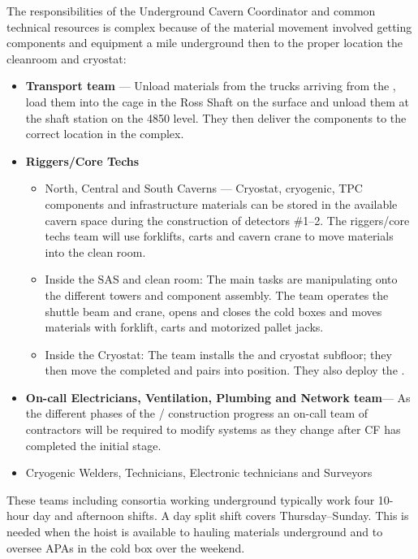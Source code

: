 The responsibilities of the Underground Cavern Coordinator and common
technical resources is complex because of the material movement
involved getting components and equipment a mile underground then to
the proper location the cleanroom and cryostat:
\begin{itemize}
  \item {\bf Transport team} --- Unload materials from the trucks arriving
    from the , load them into the cage in the Ross Shaft on the
    surface and unload them at the shaft station on the 4850 level.
    They then deliver the components to the correct location in the
     complex.
  \item {\bf {} Riggers/Core Techs}
    \begin{itemize}
      \item North, Central and South Caverns --- Cryostat, cryogenic,
        TPC components and infrastructure materials can be stored in
        the available cavern space during the construction of
        detectors \#1--2.  The  riggers/core techs team will use
        forklifts, carts and cavern crane to move materials into the
        clean room.
      \item Inside the SAS and clean room: The main tasks are
        manipulating  onto the different 
        towers and  component assembly. The team operates
        the shuttle beam and crane, opens and closes the cold boxes
        and moves materials with forklift, carts and motorized pallet
        jacks.
      \item Inside the Cryostat: The  team installs the
         and cryostat subfloor; they then move the
        completed  and  pairs into
        position. They also deploy the .
    \end{itemize}
  \item {\bf On-call Electricians, Ventilation, Plumbing and Network
    team}--- As the different phases of the /
    construction progress an on-call team of contractors will be
    required to modify systems as they change after CF has completed
    the initial stage.
   \item  Cryogenic Welders, Technicians, Electronic technicians and Surveyors
\end{itemize}

These teams including consortia working underground typically work
four 10-hour day and afternoon shifts.  A day split shift covers
Thursday--Sunday. This is needed when the hoist is available to hauling
materials underground and to oversee APAs in the cold box over the
weekend.

